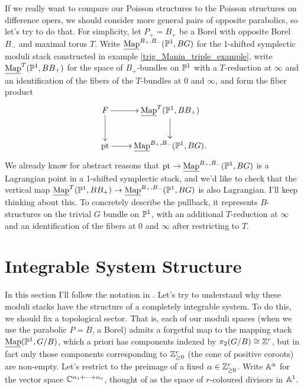 \documentclass[10pt, oneside, a4paper]{article}
\newcommand{\map}{\ul{\mr{Map}}}
\begin{document}
\begin{example} \label{Borel_example}
If we really want to compare our Poisson structures to the Poisson structures on difference opers, we should consider more general pairs of opposite parabolics, so let's try to do that.  For simplicity, let $P_+= B_+$ be a Borel with opposite Borel $B_-$ and maximal torus $T$.  Write $\map^{B_+, B_-}(\bb P^1, BG)$ for the 1-shifted symplectic moduli stack constructed in example \ref{trig_Manin_triple_example}, write $\map^{T}(\bb P^1, BB_+)$ for the space of $B_+$-bundles on $\mathbb{P}^1$ with a $T$-reduction at $\infty$ and an identification of the fibers of the $T$-bundles at $0$ and $\infty$, and form the fiber product
\[\xymatrix{
 F \ar[r]\ar[d] & \map^{T}(\bb P^1, BB_+) \ar[d]\\
 \pt\ar[r] &\map^{B_+,B_-}(\bb P^1, BG).
}\]
We already know for abstract reasons that $\pt\to\map^{B_+,B_-}(\bb P^1, BG)$ is a Lagrangian point in a 1-shifted symplectic stack, and we'd like to check that the vertical map $\map^{T}(\bb P^1, BB_+) \to \map^{B_+,B_-}(\bb P^1, BG)$ is also Lagrangian.  I'll keep thinking about this.  To concretely describe the pullback, it represents $B$-structures on the trivial $G$ bundle on $\mathbb{P}^1$, with an additional $T$-reduction at $\infty$ and an identification of the fibers at $0$ and $\infty$ after restricting to $T$.
\end{example}

\section{Integrable System Structure}
In this section I'll follow the notation in \cite{FKR}.  Let's try to understand why these moduli stacks have the structure of a completely integrable system.  To do this, we should fix a topological sector. That is, each of our moduli spaces (when we use the parabolic $P = B$, a Borel) admits a forgetful map to the mapping stack $\map(\bb P^1, G/B)$, which a priori has components indexed by $\pi_2(G/B) \cong \mathbb{Z}^r$, but in fact only those components corresponding to $\mathbb{Z}^r_{\ge 0}$ (the cone of positive coroots) are non-empty.  Let's restrict to the preimage of a fixed $\alpha \in \mathbb{Z}^r_{\ge 0}$.  Write $\mathbb{A}^\alpha$ for the vector space $\mathbb{C}^{\alpha_1 + \cdots + \alpha_r}$, thought of as the space of $r$-coloured divisors in $\mathbb{A}^1$.
\end{document}
